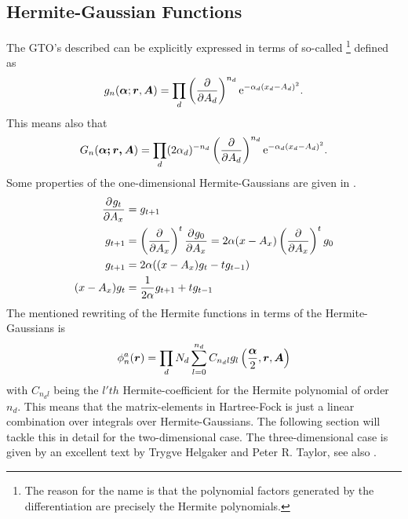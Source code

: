 \subsection{Hermite-Gaussian Functions\label{sec:hermiteGaussFunc}}
    The GTO's described can be explicitly expressed in terms of so-called
    \footnote{The reason for the name is that
    the polynomial factors generated by the differentiation are precisely the
    Hermite polynomials.} defined as
        \begin{equation}
            g_n(\boldsymbol{{\alpha}};\boldsymbol{{r}},\boldsymbol{{A}}) = \prod_d
            \left(\frac{\mathrm{\partial}}{\mathrm{\partial} A_d}\right)^{n_d} \mathrm{e}^{-\alpha_d(x_d-A_d)^2}.
        \end{equation}
    This means also that
        \begin{equation}
            G_n(\boldsymbol{{\alpha;\boldsymbol{{r}},\boldsymbol{{A}}}}) = \prod_d
            (2\alpha_d)^{-n_d}\left(\frac{\mathrm{\partial}}{\mathrm{\partial} A_d}\right)^{n_d} \mathrm{e}^{-\alpha_d(x_d-A_d)^2}.
        \end{equation}
    Some properties of the one-dimensional Hermite-Gaussians are given in
    .
        \begin{equation}
            \begin{aligned}
                \prd{A_x}[g_t] &= g_{t+1} \\
                g_{t+1} &= \prdp{A_x}{t}\prd{A_x}[g_0] =
                2\alpha(x-A_x)\prdp{A_x}{t}g_0 \\
                g_{t+1} &= 2\alpha((x-A_x)g_t - tg_{t-1}) \\
                (x-A_x)g_t &= \frac{1}{2\alpha}g_{t+1} + tg_{t-1}
            \end{aligned}
            \label{eq:hermiteGaussProp}
        \end{equation}
    The mentioned rewriting of the Hermite functions in terms of the
    Hermite-Gaussians is
        \begin{equation}
            \phi^a_n(\boldsymbol{{r}}) = \prod_d N_d \sum\limits^{n_d}_{l=0} C_{n_dl}
            g_l\left(\frac{\boldsymbol{{\alpha}}}{2},\boldsymbol{{r}},\boldsymbol{{A}}\right)
        \end{equation}
    with $C_{n_dl}$ being the $l'th$ Hermite-coefficient for the Hermite
    polynomial of order $n_d$. This means that the matrix-elements in
    Hartree-Fock is just a linear combination over integrals over
    Hermite-Gaussians. The following section will tackle this in detail for the
    two-dimensional case. The three-dimensional case is given by an excellent
    text by Trygve Helgaker and Peter R. Taylor\cite{HelgakerTaylorGauss}, see
    also \cite{HelgakerGauss}.

